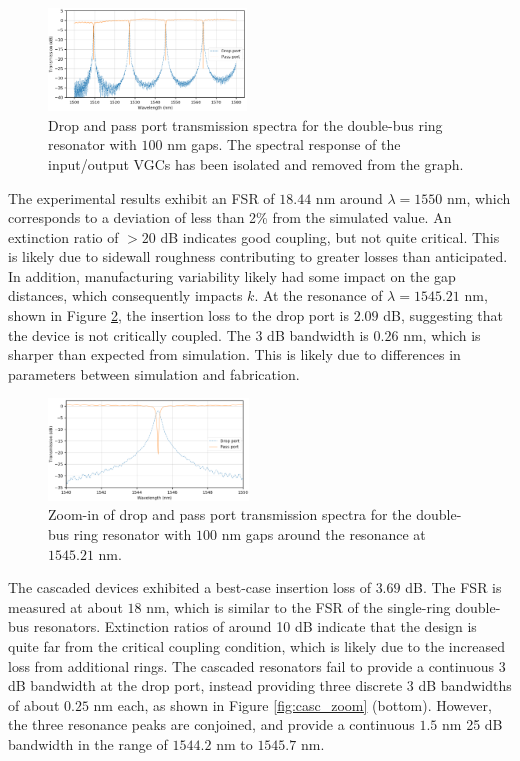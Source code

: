 \documentclass[letterpaper, 10 pt, conference]{ieeeconf}
\begin{document}
\begin{figure}[!ht]
    \centering
    \includegraphics[width = 0.47\textwidth]{exp_full.png}
    \caption{Drop and pass port transmission spectra for the double-bus ring resonator with $100$ nm gaps. The spectral response of the input/output VGCs has been isolated and removed from the graph. }
    \label{fig:exp_full}
\end{figure}
The experimental results exhibit an FSR of $18.44$ nm around $\lambda = 1550$ nm, which corresponds to a deviation of less than 2\% from the simulated value. An extinction ratio of $>20$ dB indicates good coupling, but not quite critical. This is likely due to sidewall roughness contributing to greater losses than anticipated. In addition, manufacturing variability likely had some impact on the gap distances, which consequently impacts $k$. At the resonance of $\lambda = 1545.21$ nm, shown in Figure \ref{fig:exp_zoom}, the insertion loss to the drop port is $2.09$ dB, suggesting that the device is not critically coupled. The 3 dB bandwidth is $0.26$ nm, which is sharper than expected from simulation. This is likely due to differences in parameters between simulation and fabrication.

\begin{figure}[!ht]
    \centering
    \includegraphics[width = 0.475\textwidth]{exp_RR.png}
    \caption{Zoom-in of drop and pass port transmission spectra for the double-bus ring resonator with $100$ nm gaps around the resonance at $1545.21$ nm. }
    \label{fig:exp_zoom}
\end{figure} 
The cascaded devices exhibited a best-case insertion loss of $3.69$ dB. The FSR is measured at about $18$ nm, which is similar to the FSR of the single-ring double-bus resonators. Extinction ratios of around 10 dB indicate that the design is quite far from the critical coupling condition, which is likely due to the increased loss from additional rings. The cascaded resonators fail to provide a continuous 3 dB bandwidth at the drop port, instead providing three discrete 3 dB bandwidths of about $0.25$ nm each, as shown in Figure \ref{fig:casc_zoom} (bottom). However, the three resonance peaks are conjoined, and provide a continuous $1.5$ nm 25 dB bandwidth in the range of $1544.2$ nm to $1545.7$ nm.
\end{document}
